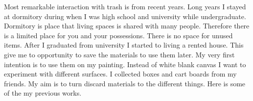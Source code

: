 
Most remarkable interaction with trash is from recent years. Long years I stayed at dormitory during when I was high school and university while undergraduate. Dormitory is place that living spaces is shared with many people. Therefore there is a limited place for you and your possessions. There is no space for unused items. After I graduated from university I started to living a rented house. This give me to opportunity to save the materials to use them later. My very first intention is to use them on my painting. Instead of white blank canvas I want to experiment with different surfaces. I collected boxes and cart boards from my friends. My aim is to turn discard materials to the different things. Here is some of the my previous works.

